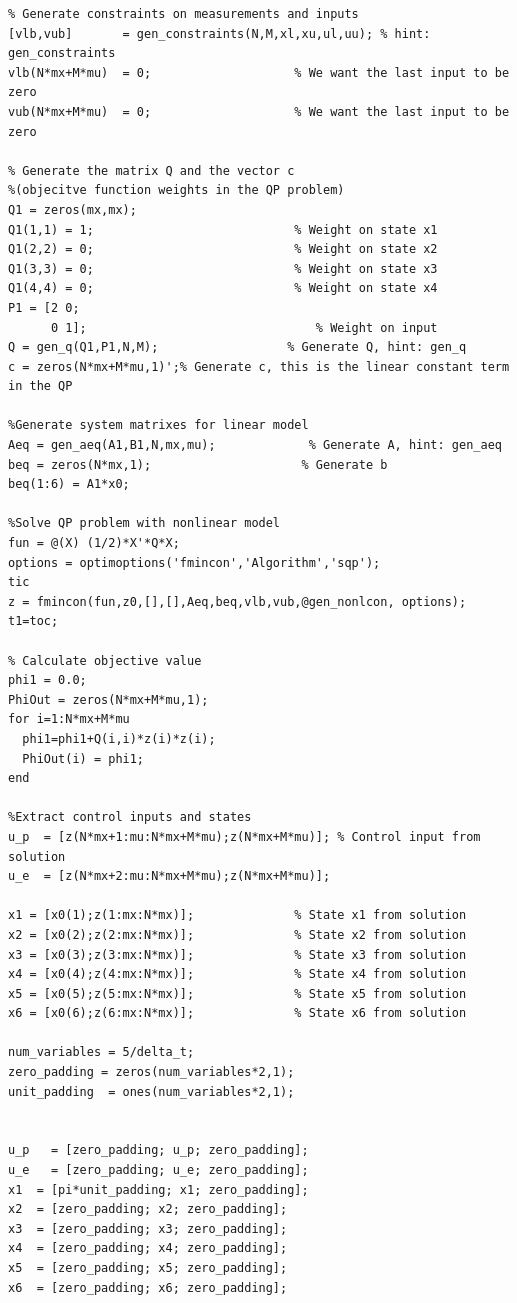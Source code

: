 \begin{verbatim}
% Generate constraints on measurements and inputs
[vlb,vub]       = gen_constraints(N,M,xl,xu,ul,uu); % hint: gen_constraints
vlb(N*mx+M*mu)  = 0;                    % We want the last input to be zero
vub(N*mx+M*mu)  = 0;                    % We want the last input to be zero

% Generate the matrix Q and the vector c 
%(objecitve function weights in the QP problem)
Q1 = zeros(mx,mx);
Q1(1,1) = 1;                            % Weight on state x1
Q1(2,2) = 0;                            % Weight on state x2
Q1(3,3) = 0;                            % Weight on state x3
Q1(4,4) = 0;                            % Weight on state x4
P1 = [2 0;
      0 1];                                % Weight on input
Q = gen_q(Q1,P1,N,M);                  % Generate Q, hint: gen_q
c = zeros(N*mx+M*mu,1)';% Generate c, this is the linear constant term in the QP

%Generate system matrixes for linear model
Aeq = gen_aeq(A1,B1,N,mx,mu);             % Generate A, hint: gen_aeq
beq = zeros(N*mx,1);                     % Generate b
beq(1:6) = A1*x0;

%Solve QP problem with nonlinear model
fun = @(X) (1/2)*X'*Q*X;
options = optimoptions('fmincon','Algorithm','sqp');
tic
z = fmincon(fun,z0,[],[],Aeq,beq,vlb,vub,@gen_nonlcon, options);
t1=toc;

% Calculate objective value
phi1 = 0.0;
PhiOut = zeros(N*mx+M*mu,1);
for i=1:N*mx+M*mu
  phi1=phi1+Q(i,i)*z(i)*z(i);
  PhiOut(i) = phi1;
end

%Extract control inputs and states
u_p  = [z(N*mx+1:mu:N*mx+M*mu);z(N*mx+M*mu)]; % Control input from solution
u_e  = [z(N*mx+2:mu:N*mx+M*mu);z(N*mx+M*mu)];

x1 = [x0(1);z(1:mx:N*mx)];              % State x1 from solution
x2 = [x0(2);z(2:mx:N*mx)];              % State x2 from solution
x3 = [x0(3);z(3:mx:N*mx)];              % State x3 from solution
x4 = [x0(4);z(4:mx:N*mx)];              % State x4 from solution
x5 = [x0(5);z(5:mx:N*mx)];              % State x5 from solution
x6 = [x0(6);z(6:mx:N*mx)];              % State x6 from solution

num_variables = 5/delta_t;
zero_padding = zeros(num_variables*2,1);
unit_padding  = ones(num_variables*2,1);


u_p   = [zero_padding; u_p; zero_padding];
u_e   = [zero_padding; u_e; zero_padding];
x1  = [pi*unit_padding; x1; zero_padding];
x2  = [zero_padding; x2; zero_padding];
x3  = [zero_padding; x3; zero_padding];
x4  = [zero_padding; x4; zero_padding];
x5  = [zero_padding; x5; zero_padding];
x6  = [zero_padding; x6; zero_padding];


\end{verbatim}
